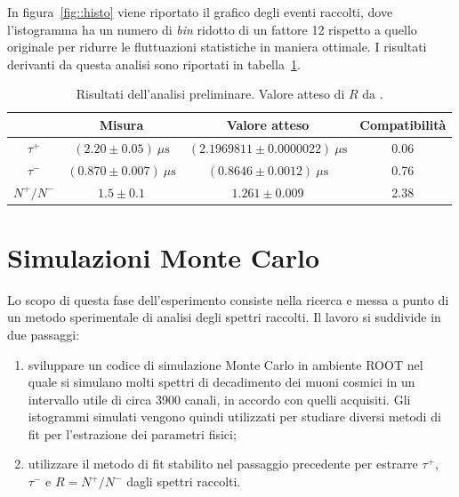 \documentclass[10pt, oneside, a4paper]{article}   	%
\begin{document}
In figura~\ref{fig::histo} viene riportato il grafico degli eventi raccolti, dove l'istogramma ha un numero di \emph{bin} ridotto di un fattore 12 rispetto a quello originale per ridurre le fluttuazioni statistiche in maniera ottimale. I risultati derivanti da questa analisi sono riportati in tabella~\ref{results}.
%
\begin{table}[H]
	\centering
	\begin{tabular}{cccc}
		\toprule
				& Misura	& Valore atteso 	& Compatibilità \\	
		\midrule
		$\tau^+$	& $(2.20 \pm 0.05) \ \mu \mbox{s}$ 	& $(2.1969811 \pm 0.0000022) \  \mu \mbox{s}$ 	& 0.06 	\\
		$\tau^-$	& $(0.870 \pm 0.007)  \ \mu \mbox{s}$ 	& $(0.8646 \pm 0.0012)  \ \mu \mbox{s}$ 		& 0.76	\\
		$N^+/N^-$	& $1.5 \pm 0.1$ 	& $1.261 \pm 0.009$ 		& 2.38	\\
		\bottomrule
	\end{tabular}
	\caption{Risultati dell'analisi preliminare. Valore atteso di $R$ da \cite{R}.}
	\label{results}
\end{table}
%
\cleardoublepage
\section{Simulazioni Monte Carlo}
Lo scopo di questa fase dell'esperimento consiste nella ricerca e messa a punto di un metodo sperimentale di analisi degli spettri raccolti. Il lavoro si suddivide in due passaggi:
\begin{enumerate}
 \item sviluppare un codice di simulazione Monte Carlo in ambiente ROOT \cite{root} nel quale si simulano molti spettri di decadimento dei muoni cosmici in un intervallo utile di circa 3900 canali, in accordo con quelli acquisiti. Gli istogrammi simulati vengono quindi utilizzati per studiare diversi metodi di fit per l'estrazione dei parametri fisici;
 \item utilizzare il metodo di fit stabilito nel passaggio precedente per estrarre $\tau^+$, $\tau^-$ e $R=N^+/N^-$ dagli spettri raccolti.
\end{enumerate}
%
\end{document}
